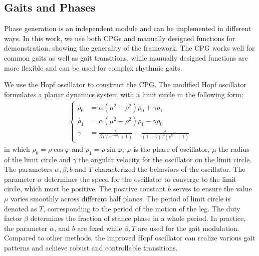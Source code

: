 \documentclass[letterpaper, 10 pt, journal, twoside]{IEEEtran} %
\begin{document}
\subsection{Gaits and Phases}\label{sec_gait}
Phase generation is an independent module and can be implemented in different ways. In this work, we use both CPGs and manually designed functions for demonstration, showing the generality of the framework. The CPG works well for common gaits as well as gait transitions, while manually designed functions are more flexible and can be used for complex rhythmic gaits.

We use the Hopf oscillator\cite{7090642} to construct the CPG. The modified Hopf oscillator formulates a planar dynamics system with a limit circle in the following form:
\begin{eqnarray}
	\label{eq_method_hopf_0}
	\begin{cases}
		\dot{\rho_0} &=\alpha\left(\mu^2-\rho^2\right)\rho_0+\gamma\rho_1 \\
		\dot{\rho_1} &=\alpha\left(\mu^2-\rho^2\right)\rho_1-\gamma\rho_0 \\
		\gamma &=\frac{\pi}{\beta T \left(e^{-b\rho_1}+1\right)} + \frac{\pi}{\left(1-\beta\right) T \left(e^{b\rho_1}+1\right)}
	\end{cases}
\end{eqnarray}
in which $\rho_0=\rho\cos\varphi$ and $\rho_1=\rho\sin\varphi$, $\varphi$ is the phase of oscillator, $\mu$ the radius of the limit circle and $\gamma$ the angular velocity for the oscillator on the limit circle. The parameters $\alpha, \beta, b$ and $T$ characterized the behaviors of the oscillator. The parameter $\alpha$ determines the speed for the oscillator to converge to the limit circle, which must be positive. The positive constant $b$ serves to ensure the value $\mu$ varies smoothly across different half planes. The period of limit circle is denoted as $T$, corresponding to the period of the motion of the leg. The duty factor $\beta$ determines the fraction of stance phase in a whole period. In practice, the parameter $\alpha$, and $b$ are fixed while $\beta,T$ are used for the gait modulation. Compared to other methods, the improved Hopf oscillator can realize various gait patterns and achieve robust and controllable transitions.
\end{document}
